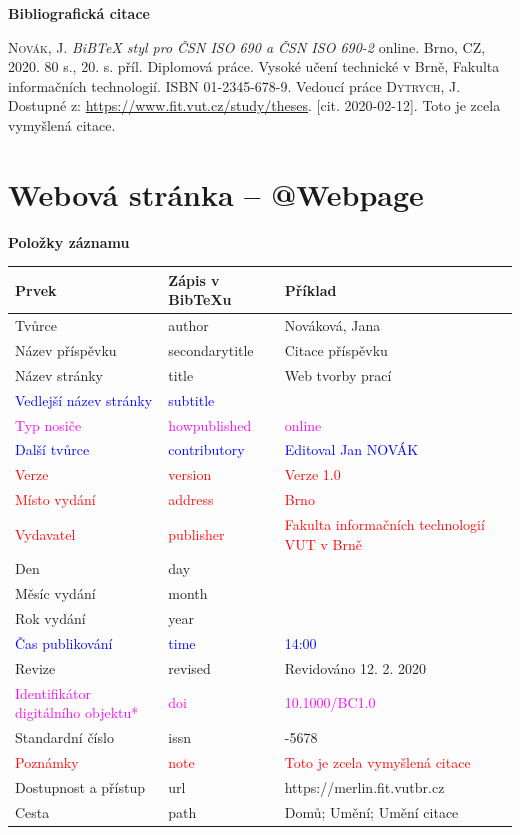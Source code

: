 \bigskip

\noindent \textbf{Bibliografická citace}

\medskip

\noindent \textsc{Novák}, J. \textit{BiBTeX styl pro ČSN ISO 690 a ČSN ISO 690-2} online. Brno, CZ, 2020. 80 s., 20. s. příl. Diplomová práce. Vysoké učení technické v Brně, Fakulta informačních technologií. ISBN 01-2345-678-9. Vedoucí práce \textsc{Dytrych}, J. Dostupné z: \url{https://www.fit.vut.cz/study/theses}. [cit. 2020-02-12]. Toto je zcela vymyšlená citace.
\newpage
\section*{Webová stránka -- @Webpage}
\label{pr-webpage}
\noindent \textbf{Položky záznamu}

\medskip

\begin{tabularx}{0.95\linewidth}{>{\raggedright\arraybackslash}X X >{\raggedright\arraybackslash}X}
   Prvek & Zápis v BibTeXu & Příklad\\\hline
   Tvůrce & author & Nováková, Jana\\
   Název příspěvku & secondarytitle & Citace příspěvku\\
   Název stránky & title & Web tvorby prací\\
   \textcolor{blue}{Vedlejší název stránky}  &  \textcolor{blue}{subtitle} & \\
   \textcolor{magenta}{Typ nosiče} & \textcolor{magenta}{howpublished} & \textcolor{magenta}{online}\\
   \textcolor{blue}{Další tvůrce} & \textcolor{blue}{contributory} & \textcolor{blue}{Editoval Jan NOVÁK}\\
   \textcolor{red}{Verze} & \textcolor{red}{version} & \textcolor{red}{Verze 1.0}\\
   \textcolor{red}{Místo vydání} & \textcolor{red}{address} & \textcolor{red}{Brno}\\
   \textcolor{red}{Vydavatel} & \textcolor{red}{publisher} & \textcolor{red}{Fakulta informačních technologií VUT v Brně}\\
   Den & day & 12\\
   Měsíc vydání & month & 2\\
   Rok vydání & year & 2020\\
   \textcolor{blue}{Čas publikování} & \textcolor{blue}{time} & \textcolor{blue}{14:00}\\
   Revize & revised & Revidováno 12. 2. 2020\\
   \textcolor{magenta}{Identifikátor digitálního objektu*} & \textcolor{magenta}{doi} & \textcolor{magenta}{10.1000/BC1.0}\\
   Standardní číslo & issn & 1234-5678\\
   \textcolor{red}{Poznámky} & \textcolor{red}{note} & \textcolor{red}{Toto je zcela vymyšlená citace}\\
   Dostupnost a přístup & url & https://merlin.fit.vutbr.cz\\
   Cesta & path & Domů; Umění; Umění citace
\end{tabularx}

